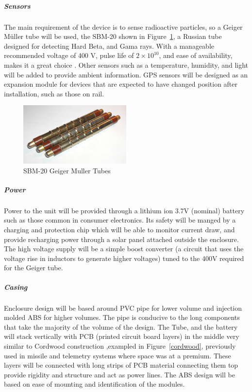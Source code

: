 \documentclass[10pt]{article}
\begin{document}
\subparagraph{Sensors}
The main requirement of the device is to sense radioactive particles, so a 
Geiger M\"{u}ller tube will be used, the SBM-20 shown in Figure~\ref{sbm20}, a 
Russian tube designed for detecting Hard Beta, and Gama rays. With a manageable 
recommended voltage of 400 V, pulse life of $2 \times 10^{10}$, and ease of 
availability, makes it a great choice \cite{Bodunova-Skvortsova}. Other sensors 
such as a temperature, humidity, and light will be added to provide ambient 
information. GPS sensors will be designed as an expansion module for devices 
that are expected to have changed position after installation, such as those 
on rail.

\begin{figure}[h]
  \centering
    \includegraphics[width=0.5\textwidth]{sbm20}
  \caption{SBM-20 Geiger Muller Tubes \cite{Bodunova-Skvortsova} \label{sbm20}}
\end{figure}

\subparagraph{Power}
Power to the unit will be provided through a lithium ion 3.7V (nominal) battery such 
as those common in consumer electronics. Its safety will be manged by a charging and 
protection chip which will be able to monitor current draw, and provide recharging power 
through a solar panel attached outside the enclosure. The high voltage supply will be a 
simple boost converter (a circuit that uses the voltage rise in inductors to generate 
higher voltages) tuned to the 400V required for the Geiger tube.

\subparagraph{Casing}
Enclosure design will be based around PVC pipe for lower volume and injection molded 
ABS for higher volumes. The pipe is conducive to the long components that take the majority
of the volume of the design. The Tube, and the battery will stack vertically with PCB 
(printed circuit board layers) in the middle very similar to Cordwood construction 
,exampled in Figure~\ref{cordwood}, previously used in missile and telemetry systems 
where space was at a premium. These layers will be connected with long strips of PCB 
material connecting them top provide rigidity and structure and act as power lines. 
The ABS design will be based on ease of mounting and identification of the modules. 
\end{document}
